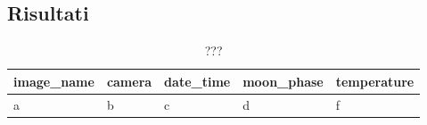 \documentclass[12pt,a4paper,twoside]{article}
\begin{document}
\subsection{Risultati}

\begin{table}[!ht]
    \centering
    \begin{tabular}{|l|l|l|l|l|}
        \hline
        \textbf{image\_name} & \textbf{camera} & \textbf{date\_time} & \textbf{moon\_phase} & \textbf{temperature} \\ 
        \hline
        a & b & c & d & f\\
        \hline
    \end{tabular}
    \caption{???}
\end{table}
\end{document}

